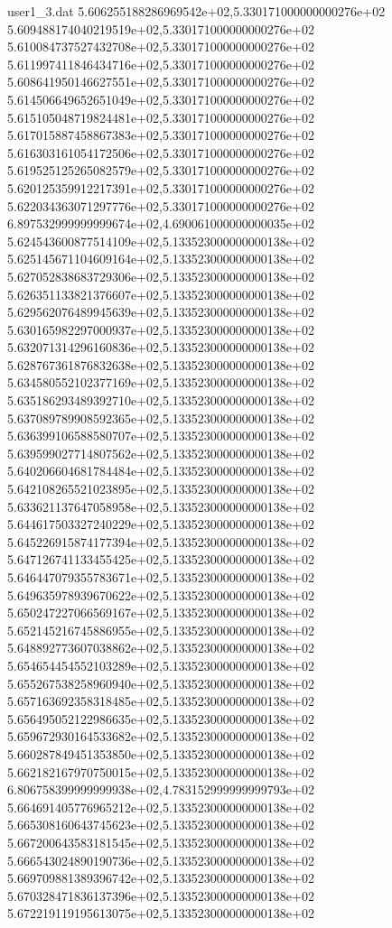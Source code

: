\begin{filecontents}{user1_3.dat}
5.606255188286969542e+02,5.330171000000000276e+02
5.609488174040219519e+02,5.330171000000000276e+02
5.610084737527432708e+02,5.330171000000000276e+02
5.611997411846434716e+02,5.330171000000000276e+02
5.608641950146627551e+02,5.330171000000000276e+02
5.614506649652651049e+02,5.330171000000000276e+02
5.615105048719824481e+02,5.330171000000000276e+02
5.617015887458867383e+02,5.330171000000000276e+02
5.616303161054172506e+02,5.330171000000000276e+02
5.619525125265082579e+02,5.330171000000000276e+02
5.620125359912217391e+02,5.330171000000000276e+02
5.622034363071297776e+02,5.330171000000000276e+02
6.897532999999999674e+02,4.690061000000000035e+02
5.624543600877514109e+02,5.133523000000000138e+02
5.625145671104609164e+02,5.133523000000000138e+02
5.627052838683729306e+02,5.133523000000000138e+02
5.626351133821376607e+02,5.133523000000000138e+02
5.629562076489945639e+02,5.133523000000000138e+02
5.630165982297000937e+02,5.133523000000000138e+02
5.632071314296160836e+02,5.133523000000000138e+02
5.628767361876832638e+02,5.133523000000000138e+02
5.634580552102377169e+02,5.133523000000000138e+02
5.635186293489392710e+02,5.133523000000000138e+02
5.637089789908592365e+02,5.133523000000000138e+02
5.636399106588580707e+02,5.133523000000000138e+02
5.639599027714807562e+02,5.133523000000000138e+02
5.640206604681784484e+02,5.133523000000000138e+02
5.642108265521023895e+02,5.133523000000000138e+02
5.633621137647058958e+02,5.133523000000000138e+02
5.644617503327240229e+02,5.133523000000000138e+02
5.645226915874177394e+02,5.133523000000000138e+02
5.647126741133455425e+02,5.133523000000000138e+02
5.646447079355783671e+02,5.133523000000000138e+02
5.649635978939670622e+02,5.133523000000000138e+02
5.650247227066569167e+02,5.133523000000000138e+02
5.652145216745886955e+02,5.133523000000000138e+02
5.648892773607038862e+02,5.133523000000000138e+02
5.654654454552103289e+02,5.133523000000000138e+02
5.655267538258960940e+02,5.133523000000000138e+02
5.657163692358318485e+02,5.133523000000000138e+02
5.656495052122986635e+02,5.133523000000000138e+02
5.659672930164533682e+02,5.133523000000000138e+02
5.660287849451353850e+02,5.133523000000000138e+02
5.662182167970750015e+02,5.133523000000000138e+02
6.806758399999999938e+02,4.783152999999999793e+02
5.664691405776965212e+02,5.133523000000000138e+02
5.665308160643745623e+02,5.133523000000000138e+02
5.667200643583181545e+02,5.133523000000000138e+02
5.666543024890190736e+02,5.133523000000000138e+02
5.669709881389396742e+02,5.133523000000000138e+02
5.670328471836137396e+02,5.133523000000000138e+02
5.672219119195613075e+02,5.133523000000000138e+02

\end{filecontents}
